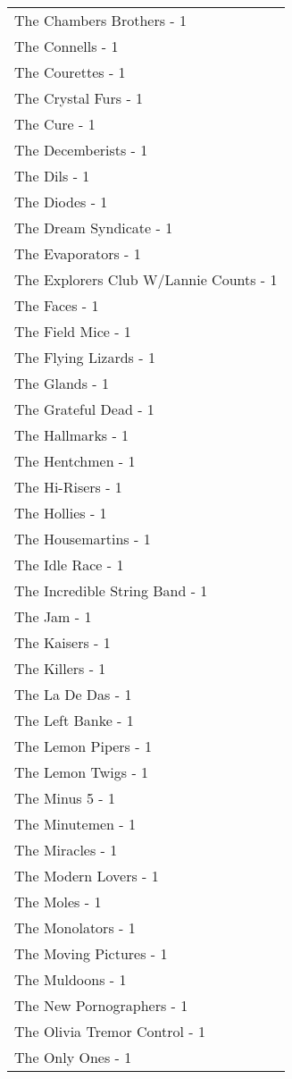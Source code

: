 \documentclass[
]{article}
\begin{document}
\begin{longtable}{l}
The Chambers Brothers - 1 \\ 
The Connells - 1 \\ 
The Courettes - 1 \\ 
The Crystal Furs - 1 \\ 
The Cure - 1 \\ 
The Decemberists - 1 \\ 
The Dils - 1 \\ 
The Diodes - 1 \\ 
The Dream Syndicate - 1 \\ 
The Evaporators - 1 \\ 
The Explorers Club W/Lannie Counts - 1 \\ 
The Faces - 1 \\ 
The Field Mice - 1 \\ 
The Flying Lizards - 1 \\ 
The Glands - 1 \\ 
The Grateful Dead - 1 \\ 
The Hallmarks - 1 \\ 
The Hentchmen - 1 \\ 
The Hi-Risers - 1 \\ 
The Hollies - 1 \\ 
The Housemartins - 1 \\ 
The Idle Race - 1 \\ 
The Incredible String Band - 1 \\ 
The Jam - 1 \\ 
The Kaisers - 1 \\ 
The Killers - 1 \\ 
The La De Das - 1 \\ 
The Left Banke - 1 \\ 
The Lemon Pipers - 1 \\ 
The Lemon Twigs - 1 \\ 
The Minus 5 - 1 \\ 
The Minutemen - 1 \\ 
The Miracles - 1 \\ 
The Modern Lovers - 1 \\ 
The Moles - 1 \\ 
The Monolators - 1 \\ 
The Moving Pictures - 1 \\ 
The Muldoons - 1 \\ 
The New Pornographers - 1 \\ 
The Olivia Tremor Control - 1 \\ 
The Only Ones - 1 \\ 

\end{longtable}
\end{document}

